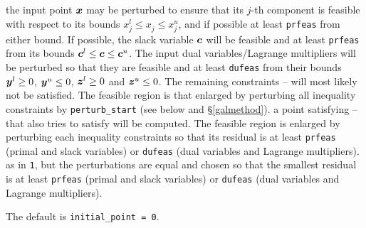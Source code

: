 \documentclass{galahad}
\begin{document}
\begin{description}
\begin{description}
 the input point ${\bm{x}}$ may be perturbed to ensure that its $j$-th
component is feasible with respect to its
bounds $x_{j}^{l}  \leq  x_{j}^{ } \leq  x_{j}^{u}$, and
if possible at least {\tt prfeas} from either bound. If possible, 
the slack variable ${\bm{c}}$ will be feasible and at least {\tt prfeas} from 
its bounds ${\bm{c}}^{l} \leq {\bm{c}} \leq {\bm{c}}^{u}$.
The input dual variables/Lagrange multipliers will be perturbed so that they 
are feasible and at least 
{\tt dufeas} from their bounds  ${\bm{y}}^{l} \geq 0$, ${\bm{y}}^{u} \leq 0$,
${\bm{z}}^{l} \geq 0$ and  ${\bm{z}}^{u} \leq 0$. The remaining constraints
-- will most likely not be satisfied. The feasible region
is that enlarged by perturbing all inequality constraints by 
{\tt perturb\_start} (see below and \S\ref{galmethod}).
 a point satisfying -- that also tries to satisfy
 will be computed. The feasible region is enlarged by perturbing
each inequality constraints so that its residual is at least
{\tt prfeas} (primal and slack variables) or
{\tt dufeas} (dual variables and Lagrange multipliers).
 as in {\tt 1}, but the perturbations are equal and chosen so that
the smallest residual is at least {\tt prfeas} (primal and slack variables) or
{\tt dufeas} (dual variables and Lagrange multipliers).
\end{description}
The default is {\tt initial\_point = 0}.






\end{description}
\end{document}
